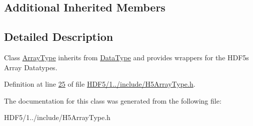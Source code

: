 \subsection*{Additional Inherited Members}


\subsection{Detailed Description}
Class \hyperlink{class_h5_1_1_array_type}{Array\+Type} inherits from \hyperlink{class_h5_1_1_data_type}{Data\+Type} and provides wrappers for the H\+D\+F5\textquotesingle{}s Array Datatypes. 

Definition at line \hyperlink{_h_d_f5_21_810_81_2include_2_h5_array_type_8h_source_l00025}{25} of file \hyperlink{_h_d_f5_21_810_81_2include_2_h5_array_type_8h_source}{H\+D\+F5/1../include/\+H5\+Array\+Type.\+h}.



The documentation for this class was generated from the following file\+:\begin{DoxyCompactItemize}
\item 
H\+D\+F5/1../include/\+H5\+Array\+Type.\+h\end{DoxyCompactItemize}
